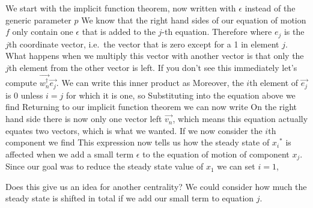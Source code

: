 \solution 
We start with the implicit function theorem, now written with $\epsilon$ instead of the generic parameter $p$ 
We know that the right hand sides of our equation of motion $f$ only contain one $\epsilon$ that is added to the $j$-th equation. Therefore 
where $e_j$ is the $j$th coordinate vector, i.e.~the vector that is zero except for a 1 in element $j$. What happens when we multiply this vector with another vector is that only the $j$th element from the other vector is left. 
If you don't see this immediately let's compute $\vec{w_n^\dag}\vec{e_j}$. 
We can write this inner product as 
Moreover, the $i$th element of $\vec{e_j}$ is 0 unless $i=j$ for which it is one, so 
Substituting into the equation above we find 
Returning to our implicit function theorem we can now write 
On the right hand side there is now only one vector left $\vec{v_n}$, which means this equation actually equates two vectors, which is what we wanted. If we now consider the $i$th component we find 
This expression now tells us how the steady state of ${x_i}^*$ is affected when we add a small term $\epsilon$ to the equation of motion of component $x_j$. Since our goal was to reduce the steady state value of $x_1$ we can set $i=1$, 

Does this give us an idea for another centrality? We could consider how much the steady state is shifted in total if we add our small term to equation $j$. 

